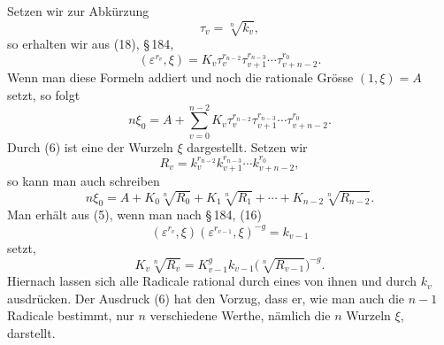 \documentclass[11pt]{article}
\begin{document}
Setzen wir zur Abk\"urzung
\begin{equation}\tag{4}
  \tau_v=\sqrt[n]{k_v},
\end{equation}
so erhalten wir aus (18), \S\,184,
\begin{equation}\tag{5}
  (\varepsilon^{r_v},\xi)=K_v\tau_v^{r_{n-2}}\tau_{v+1}^{r_{n-3}}\cdots\tau_{v+n-2}^{r_0}.
\end{equation}
Wenn man diese Formeln addiert und noch die rationale Gr\"osse $(1,\xi)=A$ setzt, so folgt
\begin{equation}\tag{6}
  n\xi_0=A+\sum_{v=0}^{n-2}K_v\tau_v^{r_{n-2}}\tau_{v+1}^{r_{n-3}}\cdots\tau_{v+n-2}^{r_0}.
\end{equation}
Durch (6) ist eine der Wurzeln $\xi$ dargestellt. Setzen wir
\[
  R_v=k_v^{r_{n-2}}k_{v+1}^{r_{n-3}}\cdots k_{v+n-2}^{r_0},
\]
so kann man auch schreiben
\begin{equation}\tag{7}
  n\xi_0=A+K_0\sqrt[n]{R_0}+K_1\sqrt[n]{R_1}+\cdots+K_{n-2}\sqrt[n]{R_{n-2}}.
\end{equation}
Man erh\"alt aus (5), wenn man nach \S\,184, (16)
\[
  (\varepsilon^{r_v},\xi)(\varepsilon^{r_{v-1}},\xi)^{-g}=k_{v-1}
\]
setzt,
\begin{equation}\tag{8}
  K_v\sqrt[n]{R_v}=K_{v-1}^{g} k_{v-1}\bigl(\sqrt[n]{R_{v-1}}\bigr)^{-g}.
\end{equation}
Hiernach lassen sich alle Radicale rational durch eines von ihnen und durch $k_v$ ausdr\"ucken. Der Ausdruck (6) hat den Vorzug, dass er, wie man auch die $n-1$ Radicale bestimmt, nur $n$ verschiedene Werthe, n\"amlich die $n$ Wurzeln $\xi$, darstellt.
\end{document}

